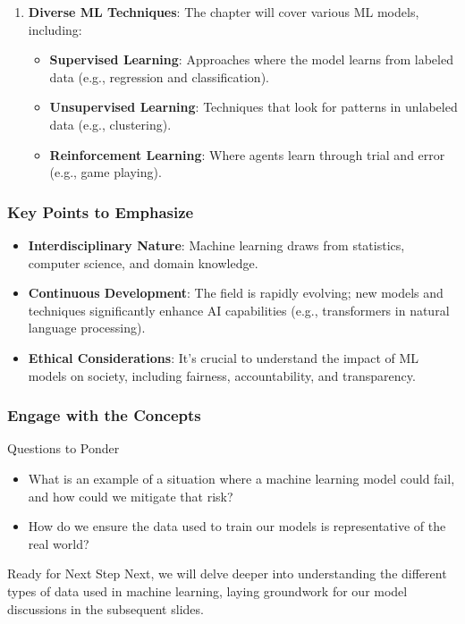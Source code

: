 \documentclass[aspectratio=169]{beamer}
\begin{document}
\begin{frame}[fragile]
\begin{enumerate}
        \item \textbf{Diverse ML Techniques}:
        The chapter will cover various ML models, including:
        \begin{itemize}
            \item \textbf{Supervised Learning}: Approaches where the model learns from labeled data (e.g., regression and classification).
            \item \textbf{Unsupervised Learning}: Techniques that look for patterns in unlabeled data (e.g., clustering).
            \item \textbf{Reinforcement Learning}: Where agents learn through trial and error (e.g., game playing).
        \end{itemize}
    \end{enumerate}
\end{frame}

\begin{frame}[fragile]
    \frametitle{Key Points to Emphasize}
    \begin{itemize}
        \item \textbf{Interdisciplinary Nature}: 
        Machine learning draws from statistics, computer science, and domain knowledge.
        \item \textbf{Continuous Development}: 
        The field is rapidly evolving; new models and techniques significantly enhance AI capabilities (e.g., transformers in natural language processing).
        \item \textbf{Ethical Considerations}: 
        It's crucial to understand the impact of ML models on society, including fairness, accountability, and transparency.
    \end{itemize}
\end{frame}

\begin{frame}[fragile]
    \frametitle{Engage with the Concepts}
    \begin{block}{Questions to Ponder}
        \begin{itemize}
            \item What is an example of a situation where a machine learning model could fail, and how could we mitigate that risk?
            \item How do we ensure the data used to train our models is representative of the real world?
        \end{itemize}
    \end{block}
    
    \begin{block}{Ready for Next Step}
        Next, we will delve deeper into understanding the different types of data used in machine learning, laying groundwork for our model discussions in the subsequent slides.
    \end{block}
\end{frame}
\end{document}
